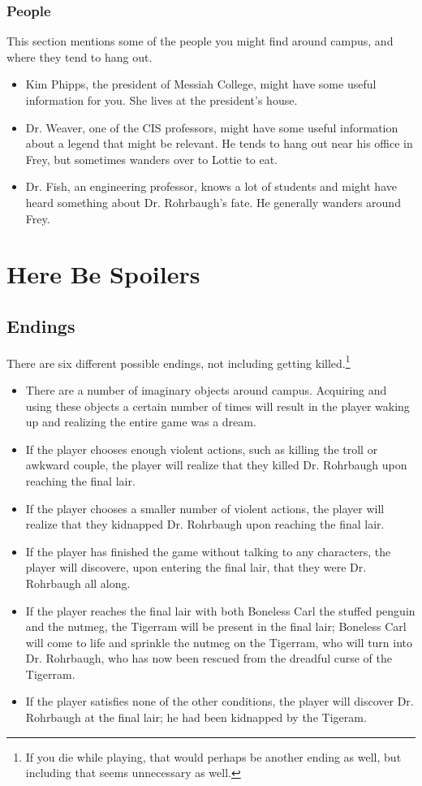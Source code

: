 \documentclass{report}
\begin{document}
\section{People}
This section mentions some of the people you might find around campus, and where they tend to hang out.

\begin{itemize}
\item Kim Phipps, the president of Messiah College, might have some useful information for you. She lives at the president's house.
\item Dr. Weaver, one of the CIS professors, might have some useful information about a legend that might be relevant. He tends to hang out near his office in Frey, but sometimes wanders over to Lottie to eat.
\item Dr. Fish, an engineering professor, knows a lot of students and might have heard something about Dr. Rohrbaugh's fate. He generally wanders around Frey.
\end{itemize}

\part{Here Be Spoilers}
\chapter{Endings}
There are six different possible endings, not including getting killed.\footnote{If you die while playing, that would perhaps be another ending as well, but including that seems unnecessary as well.}
\begin{itemize}
\item There are a number of imaginary objects around campus. Acquiring and using these objects a certain number of times will result in the player waking up and realizing the entire game was a dream.
\item If the player chooses enough violent actions, such as killing the troll or awkward couple, the player will realize that they killed Dr. Rohrbaugh upon reaching the final lair.
\item If the player chooses a smaller number of violent actions, the player will realize that they kidnapped Dr. Rohrbaugh upon reaching the final lair.
\item If the player has finished the game without talking to any characters, the player will discovere, upon entering the final lair, that they were Dr. Rohrbaugh all along.
\item If the player reaches the final lair with both Boneless Carl the stuffed penguin and the nutmeg, the Tigerram will be present in the final lair; Boneless Carl will come to life and sprinkle the nutmeg on the Tigerram, who will turn into Dr. Rohrbaugh, who has now been rescued from the dreadful curse of the Tigerram.
\item If the player satisfies none of the other conditions, the player will discover Dr. Rohrbaugh at the final lair; he had been kidnapped by the Tigeram.
\end{itemize}
\end{document}
